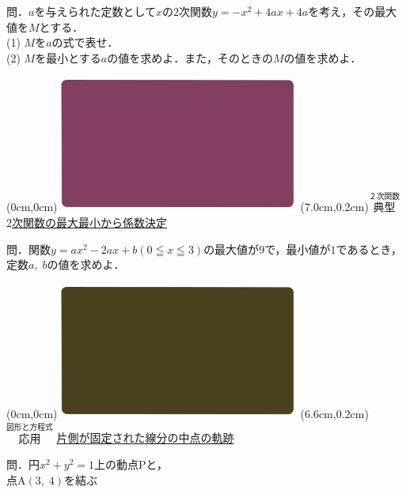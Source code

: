 \documentclass[10pt,
fleqn,
dvipdfmx,
uplatex
]{jsarticle}
\begin{document}
\normalsize 
問．$a$を与えられた定数として$x$の$2$次関数$y=-x^2+4ax+4a$を考え，その最大値を$M$とする．\\
(1)  $M$を$a$の式で表せ．\\
(2)  $M$を最小とする$a$の値を求めよ．また，そのときの$M$の値を求めよ．\\



\newpage



\at(0cm,0cm){\includegraphics[width=8cm,bb=0 0 1920 1080]{./youtube/thumbnails/templates/smart_background/２次関数.jpeg}}
\at(7.0cm,0.2cm){\small\color{bradorange}$\overset{\text{２次関数}}{\text{典型}}$}
{\color{orange}\Large\underline{$2$次関数の最大最小から係数決定}}\vspace{0.3zw}

\Large 
問．関数$y=ax^2-2ax+b\left(0\leqq x\leqq 3\right)$の最大値が$9$で，最小値が$1$であるとき，定数$a,\;b$の値を求めよ．


\newpage



\bf\boldmath

\at(0cm,0cm){\includegraphics[width=8cm,bb=0 0 1920 1080]{./youtube/thumbnails/templates/smart_background/図形と方程式.jpeg}}
\at(6.6cm,0.2cm){\small\color{bradorange}$\overset{\text{図形と方程式}}{\text{応用}}$}
{\color{orange}\Large\underline{片側が固定された線分の中点の軌跡}}\vspace{0.3zw}

\Large 
問．円$x^2+y^2=1$上の動点$\text{P}$と，\\
点$\text{A}\left(3,\;4\right)$を結ぶ
\end{document}
